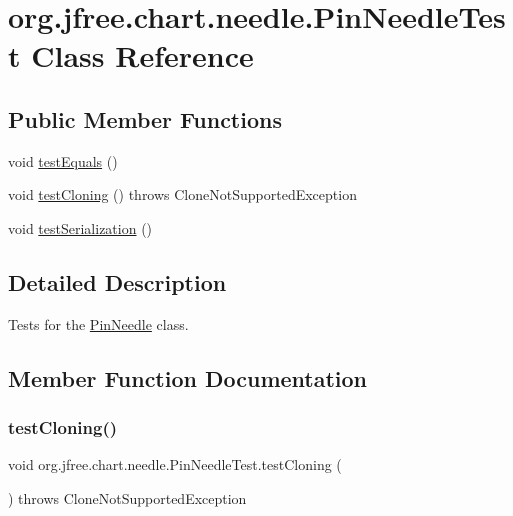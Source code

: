 \hypertarget{classorg_1_1jfree_1_1chart_1_1needle_1_1_pin_needle_test}{}\section{org.\+jfree.\+chart.\+needle.\+Pin\+Needle\+Test Class Reference}
\label{classorg_1_1jfree_1_1chart_1_1needle_1_1_pin_needle_test}
\subsection*{Public Member Functions}
\begin{DoxyCompactItemize}
\item 
void \mbox{\hyperlink{classorg_1_1jfree_1_1chart_1_1needle_1_1_pin_needle_test_a0b750e14fbacebdeceefaf69c7e9f2ee}{test\+Equals}} ()
\item 
void \mbox{\hyperlink{classorg_1_1jfree_1_1chart_1_1needle_1_1_pin_needle_test_a115fb037ca7de70c17226f3bf782badb}{test\+Cloning}} ()  throws Clone\+Not\+Supported\+Exception 
\item 
void \mbox{\hyperlink{classorg_1_1jfree_1_1chart_1_1needle_1_1_pin_needle_test_ae7f6cb9bc093c2abd59a6dc926519fc9}{test\+Serialization}} ()
\end{DoxyCompactItemize}


\subsection{Detailed Description}
Tests for the \mbox{\hyperlink{classorg_1_1jfree_1_1chart_1_1needle_1_1_pin_needle}{Pin\+Needle}} class. 

\subsection{Member Function Documentation}
\mbox{\label{classorg_1_1jfree_1_1chart_1_1needle_1_1_pin_needle_test_a115fb037ca7de70c17226f3bf782badb}} 
\subsubsection{\texorpdfstring{test\+Cloning()}{testCloning()}}
{\footnotesize\ttfamily void org.\+jfree.\+chart.\+needle.\+Pin\+Needle\+Test.\+test\+Cloning (\begin{DoxyParamCaption}{ }\end{DoxyParamCaption}) throws Clone\+Not\+Supported\+Exception}

